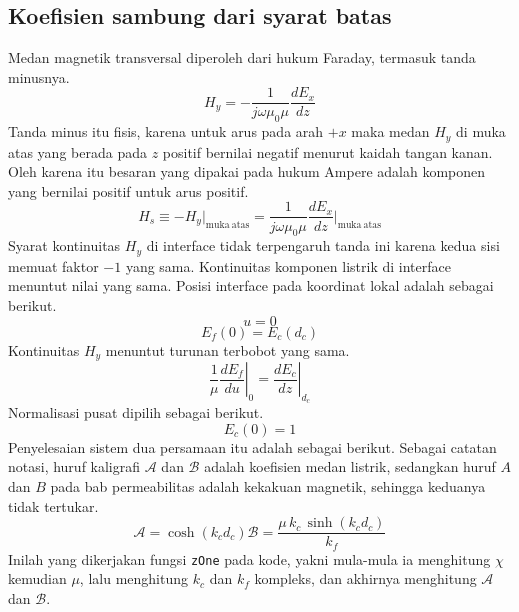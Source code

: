 \documentclass[a4paper,11pt]{article}
\begin{document}
\subsection{Koefisien sambung dari syarat batas}
Medan magnetik transversal diperoleh dari hukum Faraday, termasuk
tanda minusnya.
\begin{equation*}
H_{y} = -\frac{1}{j\omega\mu_{0}\mu}\frac{dE_{x}}{dz}
\end{equation*}
Tanda minus itu fisis, karena untuk arus pada arah $+x$ maka medan $H_{y}$
di muka atas yang berada pada $z$ positif bernilai negatif menurut kaidah
tangan kanan. Oleh karena itu besaran yang dipakai pada hukum Ampere adalah
komponen yang bernilai positif untuk arus positif.
\begin{equation*}
H_{s} \equiv -H_{y}\big|_{\mathrm{muka\ atas}}
= \frac{1}{j\omega\mu_{0}\mu}\frac{dE_{x}}{dz}\bigg|_{\mathrm{muka\ atas}}
\end{equation*}
Syarat kontinuitas $H_{y}$ di interface tidak terpengaruh tanda ini karena
kedua sisi memuat faktor $-1$ yang sama.
Kontinuitas komponen listrik di interface menuntut nilai yang sama.
Posisi interface pada koordinat lokal adalah sebagai berikut.
\begin{equation*}
u = 0
\end{equation*}
\begin{equation*}
E_{f}(0) = E_{c}(d_{c})
\end{equation*}
Kontinuitas $H_{y}$ menuntut turunan terbobot yang sama.
\begin{equation*}
\left.\frac{1}{\mu}\frac{dE_{f}}{du}\right|_{0}
=
\left.\frac{dE_{c}}{dz}\right|_{d_{c}}
\end{equation*}
Normalisasi pusat dipilih sebagai berikut.
\begin{equation*}
E_{c}(0) = 1
\end{equation*}
Penyelesaian sistem dua persamaan itu adalah sebagai berikut. Sebagai catatan
notasi, huruf kaligrafi $\mathcal{A}$ dan $\mathcal{B}$ adalah koefisien
medan listrik, sedangkan huruf $A$ dan $B$ pada bab permeabilitas adalah
kekakuan magnetik, sehingga keduanya tidak tertukar.
\begin{subequations}\label{eq:5}
\begin{equation}
\mathcal{A} = \cosh(k_{c}d_{c})
\label{eq:5a}
\end{equation}
\begin{equation}
\mathcal{B} = \frac{\mu\,k_{c}\,\sinh(k_{c}d_{c})}{k_{f}}
\label{eq:5b}
\end{equation}
\end{subequations}
Inilah yang dikerjakan fungsi \texttt{zOne} pada kode, yakni mula-mula ia
menghitung $\chi$ kemudian $\mu$, lalu menghitung $k_{c}$ dan $k_{f}$ kompleks,
dan akhirnya menghitung $\mathcal{A}$ dan $\mathcal{B}$.
\end{document}
